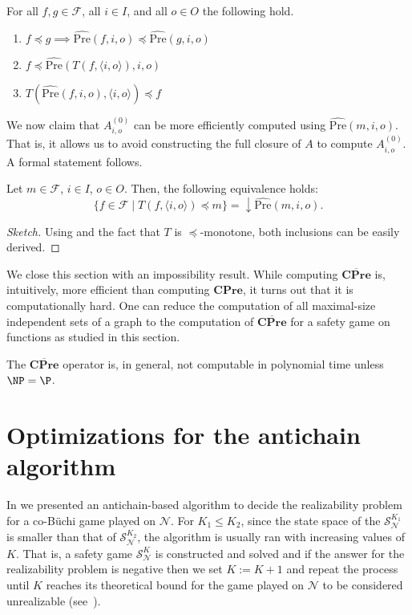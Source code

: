 \documentclass[runningheads,a4paper,draft]{llncs}
\newcommand{\cpre}{\mathbf{CPre}}
\newcommand{\calF}{\mathcal{F}}
\newcommand{\calN}{\mathcal{N}}
\newcommand{\calS}{\mathcal{S}}
\newcommand{\closedn}[1]{\mathrm{\downarrow} #1}
\newcommand{\pseudopre}{\widehat{\mathrm{Pre}}}
\begin{document}
\begin{lemma}\label{lem:order-pseudopre}
  For all $f,g \in \calF$, all $i \in I$, and all $o \in O$
  the following hold.
  \begin{enumerate}
    \item $f \preceq g \implies \pseudopre(f,i,o) \preceq \pseudopre(g,i,o)$
      \label{itm:order-pre}
    \item $f \preceq \pseudopre(T(f,\langle i, o \rangle),i,o)$
      \label{itm:order-postpre}
    \item $T(\pseudopre(f,i,o), \langle i, o \rangle) \preceq f$
      \label{itm:order-prepost}
  \end{enumerate}
\end{lemma}

We now claim that $A^{(0)}_{i,o}$ can be more efficiently computed using
$\pseudopre(m,i,o)$. That is, it allows us to avoid constructing the full
closure of $A$ to compute $A^{(0)}_{i,o}$. A formal statement follows.

\begin{proposition}
  Let $m \in \calF$, $i \in I$, $o \in O$. Then, the following equivalence
  holds:
  \[
    \{ f \in \calF \mid T(f, \langle i,
    o \rangle) \preceq m\} = \closedn{\pseudopre(m,i,o)}.
  \]
\end{proposition}
\begin{proof}[Sketch]
  Using  and the fact that $T$ is $\preceq$-monotone,
  both inclusions can be easily derived.
\end{proof}

We close this section with an impossibility result. While computing
$\overline{\cpre}$ is, intuitively, more efficient than computing $\cpre$, it
turns out that it is computationally hard. One can reduce the computation of
all maximal-size independent sets of a graph to the computation of
$\overline{\cpre}$ for a safety game on functions as studied in this section.
\begin{proposition}
  The $\overline{\cpre}$ operator is, in general, not computable in
  polynomial time unless $\NP = \P$.
\end{proposition}

\section{Optimizations for the antichain algorithm}
In  we presented an antichain-based algorithm to
decide the realizability problem for a co-B\"uchi game played on $\calN$.  For
$K_1 \leq K_2$, since the state space of the $\calS^{K_1}_\calN$ is smaller
than that of $\calS^{K_2}_\calN$, the algorithm is usually ran with increasing
values of $K$. That is, a safety game $\calS^{K}_\calN$ is constructed and
solved and if the answer for the realizability problem is negative then we set
$K := K + 1$ and repeat the process until $K$ reaches its theoretical bound for
the game played on $\calN$ to be considered unrealizable (see~).
\end{document}
